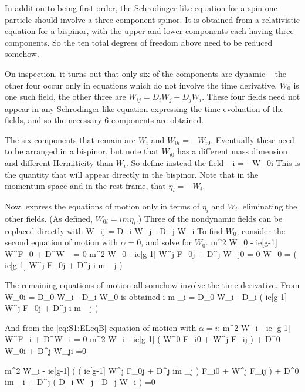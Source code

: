 In addition to being first order, the Schrodinger like equation for a spin-one particle should involve a three component spinor.  It is obtained from a relativistic equation for a bispinor, with the upper and lower components each having three components.  So the ten total degrees of freedom above need to be reduced somehow.

On inspection, it turns out that only six of the components are dynamic -- the other four occur only in equations which do not involve the time derivative.  $W_0$ is one such field, the other three are $W_{ij} = D_i W_j - D_j W_i$.  These four fields need not appear in any Schrodinger-like equation expressing the time evoluation of the fields, and so the necessary 6 components are obtained.

The six components that remain are $W_i$ and $W_{0i} = - W_{i0}$.  Eventually these need to be arranged in a bispinor, but note that $W_{i0}$ has a different mass dimension and different Hermiticity than $W_i$.  So define instead the field
\beq
	\eta_i = -  W_{0i}
\eeq
This is the quantity that will appear directly in the bispinor.  Note that in the momentum space and in the rest frame, that $\eta_i = - W_i$.  

Now, express the equations of motion only in terms of $\eta_i$ and $W_i$, eliminating the other fields.  (As defined, $W_{0i} =  im\eta_i$.)  Three of the nondynamic fields can be replaced directly with
\beq
	W_{ij} = D_i W_j - D_j W_i
\eeq
To find $W_0$, consider the second equation of motion with $\alpha=0$, and solve for $W_0$. 
\beq
	m^2 W_0 - ie[g-1] W^\nu F_{0\nu} + D^\mu W_{} = 0 
\eeq
\beq
	m^2 W_0 - ie[g-1] W^j F_{0j} + D^j W_{j0} = 0
\eeq
\beq
	W_0 =  \left( ie[g-1] W^j F_{0j} + D^j   i m \eta_j \right )
\eeq

The remaining equations of motion all somehow involve the time derivative.
From
\beq
	W_{0i} = D_0 W_i - D_i W_0
\eeq
is obtained
\beq \label{eq:S1:wA}
	i m  \eta_i = D_0 W_i - D_i  \left( ie[g-1] W^j F_{0j} + D^j i m \eta_j \right ) 
\eeq

And from the \eqref{eq:S1:ELeqB} equation of motion with $\alpha=i$:
\beq
	m^2 W_i - ie [g-1] W^\nu F_{i \nu} + D^\mu W_{\mu i} = 0	
\eeq
\beq
	m^2 W_i - ie[g-1] \left( W^0 F_{i0} + W^j F_{ij} \right ) 
		+ D^0 W_{0i} + D^j W_{ji} =0
\eeq

\beq \label{eq:S1:etaA}
	m^2 W_i - ie[g-1] \left(  \left( ie[g-1] W^j F_{0j} + D^j im \eta_j \right ) F_{i0} + W^j F_{ij} \right ) 
		+ D^0 im \eta_i + D^j \left( D_i W_j - D_j W_i \right ) =0
\eeq


